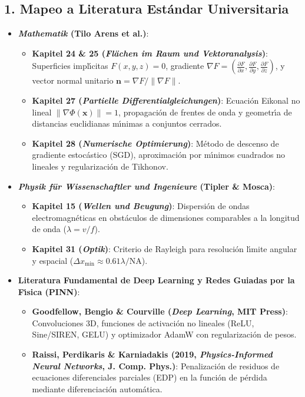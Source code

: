 \documentclass[11pt,a4paper]{article}
\begin{document}
\subsection{1. Mapeo a Literatura Est{\'a}ndar Universitaria}
\begin{itemize}
    \item \textbf{\textit{Mathematik} (Tilo Arens et al.)}:
    \begin{itemize}
        \item \textbf{Kapitel 24 \& 25 (\textit{Fl{\"a}chen im Raum und Vektoranalysis})}: Superficies impl{\'\i}citas $F(x, y, z) = 0$, gradiente $\nabla F = (\frac{\partial F}{\partial x}, \frac{\partial F}{\partial y}, \frac{\partial F}{\partial z})$, y vector normal unitario $\mathbf{n} = \nabla F / \|\nabla F\|$.
        \item \textbf{Kapitel 27 (\textit{Partielle Differentialgleichungen})}: Ecuaci{\'o}n Eikonal no lineal $\|\nabla \Phi(\mathbf{x})\| = 1$, propagaci{\'o}n de frentes de onda y geometr{\'\i}a de distancias euclidianas m{\'\i}nimas a conjuntos cerrados.
        \item \textbf{Kapitel 28 (\textit{Numerische Optimierung})}: M{\'e}todo de descenso de gradiente estoc{\'a}stico (SGD), aproximaci{\'o}n por m{\'\i}nimos cuadrados no lineales y regularizaci{\'o}n de Tikhonov.
    \end{itemize}
    \item \textbf{\textit{Physik f{\"u}r Wissenschaftler und Ingenieure} (Tipler \& Mosca)}:
    \begin{itemize}
        \item \textbf{Kapitel 15 (\textit{Wellen und Beugung})}: Dispersi{\'o}n de ondas electromagn{\'e}ticas en obst{\'a}culos de dimensiones comparables a la longitud de onda ($\lambda = v / f$).
        \item \textbf{Kapitel 31 (\textit{Optik})}: Criterio de Rayleigh para resoluci{\'o}n l{\'\i}mite angular y espacial ($\Delta x_{\min} \approx 0.61 \lambda / \text{NA}$).
    \end{itemize}
    \item \textbf{Literatura Fundamental de Deep Learning y Redes Guiadas por la F{\'\i}sica (PINN)}:
    \begin{itemize}
        \item \textbf{Goodfellow, Bengio \& Courville (\textit{Deep Learning}, MIT Press)}: Convoluciones 3D, funciones de activaci{\'o}n no lineales (ReLU, Sine/SIREN, GELU) y optimizador AdamW con regularizaci{\'o}n de pesos.
        \item \textbf{Raissi, Perdikaris \& Karniadakis (2019, \textit{Physics-Informed Neural Networks}, J. Comp. Phys.)}: Penalizaci{\'o}n de residuos de ecuaciones diferenciales parciales (EDP) en la funci{\'o}n de p{\'e}rdida mediante diferenciaci{\'o}n autom{\'a}tica.

\end{itemize}
\end{itemize}
\end{document}
